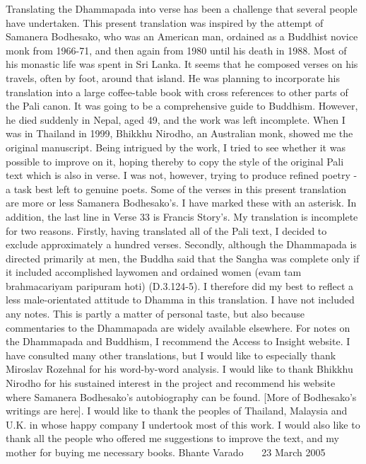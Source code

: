 Translating the Dhammapada into verse has been a challenge that several people have undertaken. This present translation was inspired by the attempt of Samanera Bodhesako, who was an American man, ordained as a Buddhist novice monk from 1966-71, and then again from 1980 until his death in 1988. Most of his monastic life was spent in Sri Lanka. It seems that he composed verses on his travels, often by foot, around that island. He was planning to incorporate his translation into a large coffee-table book with cross references to other parts of the Pali canon. It was going to be a comprehensive guide to Buddhism. However, he died suddenly in Nepal, aged 49, and the work was left incomplete.
When I was in Thailand in 1999, Bhikkhu Nirodho, an Australian monk, showed me the original manuscript. Being intrigued by the work, I tried to see whether it was possible to improve on it, hoping thereby to copy the style of the original Pali text which is also in verse. I was not, however, trying to produce refined poetry - a task best left to genuine poets. Some of the verses in this present translation are more or less Samanera Bodhesako's. I have marked these with an asterisk. In addition, the last line in Verse 33 is Francis Story's.
My translation is incomplete for two reasons. Firstly, having translated all of the Pali text, I decided to exclude approximately a hundred verses. Secondly, although the Dhammapada is directed primarily at men, the Buddha said that the Sangha was complete only if it included accomplished laywomen and ordained women (evam tam brahmacariyam paripuram hoti) (D.3.124-5). I therefore did my best to reflect a less male-orientated attitude to Dhamma in this translation.
I have not included any notes. This is partly a matter of personal taste, but also because commentaries to the Dhammapada are widely available elsewhere. For notes on the Dhammapada and Buddhism, I recommend the Access to Insight website.
I have consulted many other translations, but I would like to especially thank Miroslav Rozehnal for his word-by-word analysis.
I would like to thank Bhikkhu Nirodho for his sustained interest in the project and recommend his website where Samanera Bodhesako’s autobiography can be found. [More of Bodhesako's writings are here].
I would like to thank the peoples of Thailand, Malaysia and U.K. in whose happy company I undertook most of this work. I would also like to thank all the people who offered me suggestions to improve the text, and my mother for buying me necessary books.
Bhante Varado
   23 March 2005